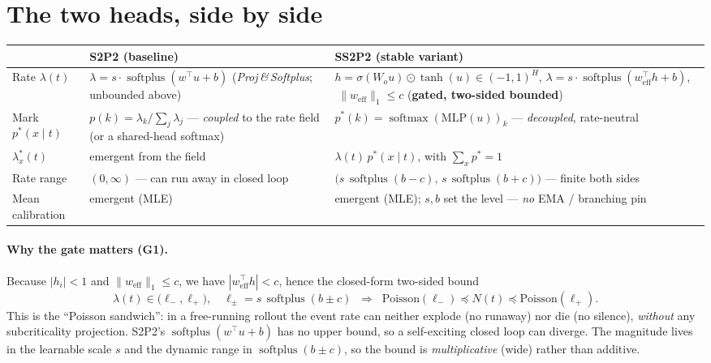 \documentclass[11pt]{article}
\newcommand{\softplus}{\operatorname{softplus}}
\newcommand{\softmax}{\operatorname{softmax}}
\begin{document}
\section{The two heads, side by side}
\begin{center}\small\renewcommand{\arraystretch}{1.35}
\begin{tabular}{>{\raggedright\arraybackslash}p{2.4cm} >{\raggedright\arraybackslash}p{6.0cm} >{\raggedright\arraybackslash}p{6.0cm}}
\toprule
 & \textbf{S2P2} (baseline) & \textbf{SS2P2} (stable variant)\\
\midrule
Rate $\lambda(t)$ &
$\lambda=s\cdot\softplus(w^\top u+b)$ \newline (\emph{Proj\,\&\,Softplus}; unbounded above) &
$h=\sigma(W_o u)\odot\tanh(u)\in(-1,1)^H$, \newline
$\lambda=s\cdot\softplus(w_{\mathrm{eff}}^\top h+b)$, $\;\|w_{\mathrm{eff}}\|_1\le c$ \newline
(\textbf{gated, two-sided bounded})\\
\addlinespace
Mark $p^*(x\mid t)$ &
$p(k)=\lambda_k/\sum_j\lambda_j$ — \emph{coupled} to the rate field (or a shared-head softmax) &
$p^*(k)=\softmax(\mathrm{MLP}(u))_k$ — \emph{decoupled}, rate-neutral\\
\addlinespace
$\lambda_x^*(t)$ & emergent from the field & $\lambda(t)\,p^*(x\mid t)$, with $\sum_x p^*=1$\\
\addlinespace
Rate range & $(0,\infty)$ — can run away in closed loop & $\bigl(s\,\softplus(b-c),\,s\,\softplus(b+c)\bigr)$ — finite both sides\\
\addlinespace
Mean calibration & emergent (MLE) & emergent (MLE); $s,b$ set the level — \emph{no} EMA / branching pin\\
\bottomrule
\end{tabular}
\end{center}

\paragraph{Why the gate matters (G1).} Because $|h_i|<1$ and $\|w_{\mathrm{eff}}\|_1\le c$, we have
$|w_{\mathrm{eff}}^\top h|<c$, hence the closed-form two-sided bound
\[
\lambda(t)\in\bigl(\ell_-,\ell_+\bigr),\quad
\ell_\pm=s\,\softplus(b\pm c)
\;\;\Rightarrow\;\;
\mathrm{Poisson}(\ell_-)\preceq N(t)\preceq\mathrm{Poisson}(\ell_+).
\]
This is the ``Poisson sandwich'': in a free-running rollout the event rate can neither
explode (no runaway) nor die (no silence), \emph{without} any subcriticality projection.
S2P2's $\softplus(w^\top u+b)$ has no upper bound, so a self-exciting closed loop can
diverge. The magnitude lives in the learnable scale $s$ and the dynamic range in
$\softplus(b\pm c)$, so the bound is \emph{multiplicative} (wide) rather than additive.
\end{document}
